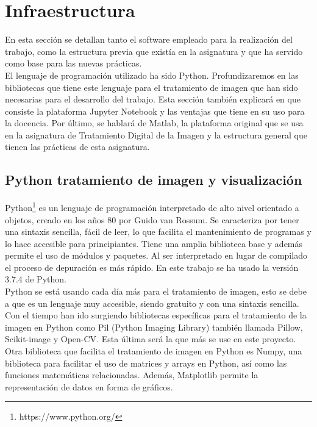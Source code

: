 \chapter{Infraestructura}

En esta sección se detallan tanto el software empleado para la realización del trabajo, como la estructura previa que existía en la asignatura y que ha servido como base para las nuevas prácticas. \\

 El lenguaje de programación utilizado ha sido Python. Profundizaremos en las bibliotecas que tiene este lenguaje para el tratamiento de imagen que han sido necesarias para el desarrollo del trabajo. Esta sección también explicará en que consiste la plataforma Jupyter Notebook y las ventajas que tiene en su uso para la docencia. Por último, se hablará de Matlab, la plataforma original que se usa en la asignatura de Tratamiento Digital de la Imagen y la estructura general que tienen las prácticas de esta asignatura.

\section{Python tratamiento de imagen y visualización}

Python\footnote{https://www.python.org/} es un lenguaje de programación interpretado de alto nivel orientado a objetos, creado en los años 80 por Guido van Rossum. Se caracteriza por tener una sintaxis sencilla, fácil de leer, lo que facilita el mantenimiento de programas y lo hace accesible para principiantes. Tiene una amplia biblioteca base y además permite el uso de módulos y paquetes. Al ser interpretado en lugar de compilado el proceso de depuración es más rápido. En este trabajo se ha usado la versión 3.7.4 de Python.\\

 Python se está usando cada día más para el tratamiento de imagen, esto se debe a que es un lenguaje muy accesible, siendo gratuito y con una sintaxis sencilla. Con el tiempo han ido surgiendo bibliotecas específicas para el tratamiento de la imagen en Python como Pil (Python Imaging Library) también llamada Pillow, Scikit-image y Open-CV. Esta última será la que más se use en este proyecto.\\

Otra biblioteca que facilita el tratamiento de imagen en Python es Numpy, una biblioteca para facilitar el uso de matrices y arrays en Python, así como las funciones matemáticas relacionadas.  Además, Matplotlib permite  la representación de datos en forma de gráficos.

